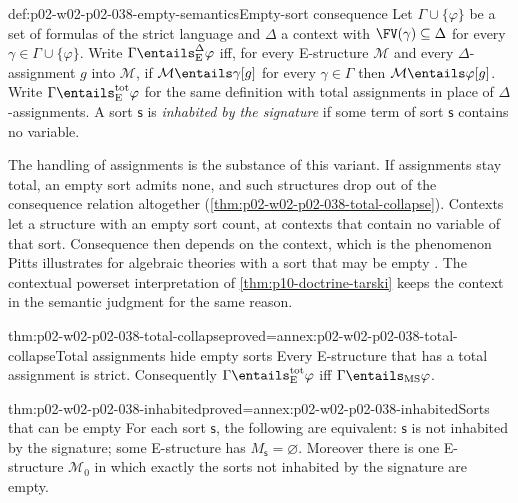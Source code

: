 \begin{hbdefinition}{def:p02-w02-p02-038-empty-semantics}{Empty-sort consequence}
Let \(\Gamma\cup\{\varphi\}\) be a set of formulas of the strict language and
\(\Delta\) a context with \(\FV(\gamma)\subseteq\Delta\) for every
\(\gamma\in\Gamma\cup\{\varphi\}\).  Write
\(\Gamma\entails^{\Delta}_{\mathrm E}\varphi\) iff, for every E-structure
\(\mathcal M\) and every \(\Delta\)-assignment \(g\) into \(\mathcal M\), if
\(\mathcal M\entails\gamma[g]\) for every \(\gamma\in\Gamma\) then
\(\mathcal M\entails\varphi[g]\).  Write
\(\Gamma\entails^{\mathrm{tot}}_{\mathrm E}\varphi\) for the same definition
with total assignments in place of \(\Delta\)-assignments.  A sort
\(\mathsf s\) is \emph{inhabited by the signature} if some term of sort
\(\mathsf s\) contains no variable.
\end{hbdefinition}

The handling of assignments is the substance of this variant.  If
assignments stay total, an empty sort admits none, and such structures drop
out of the consequence relation altogether
(\cref{thm:p02-w02-p02-038-total-collapse}).  Contexts let a structure with
an empty sort count, at contexts that contain no variable of that sort.
Consequence then depends on the context, which is the phenomenon Pitts
illustrates for algebraic theories with a sort that may be empty
\cite[Example~2.3.2, p.~11]{Pitts1995Draft}.  The contextual powerset
interpretation of \cref{thm:p10-doctrine-tarski} keeps the context in the
semantic judgment for the same reason.

\begin{hblemma}{thm:p02-w02-p02-038-total-collapse}{proved=annex:p02-w02-p02-038-total-collapse}{Total assignments hide empty sorts}
Every E-structure that has a total assignment is strict.  Consequently
\(\Gamma\entails^{\mathrm{tot}}_{\mathrm E}\varphi\) iff
\(\Gamma\entails_{\mathrm{MS}}\varphi\).
\end{hblemma}

\begin{hblemma}{thm:p02-w02-p02-038-inhabited}{proved=annex:p02-w02-p02-038-inhabited}{Sorts that can be empty}
For each sort \(\mathsf s\), the following are equivalent: \(\mathsf s\) is
not inhabited by the signature; some E-structure has
\(M_{\mathsf s}=\varnothing\).  Moreover there is one E-structure
\(\mathcal M_{0}\) in which exactly the sorts not inhabited by the signature
are empty.
\end{hblemma}

